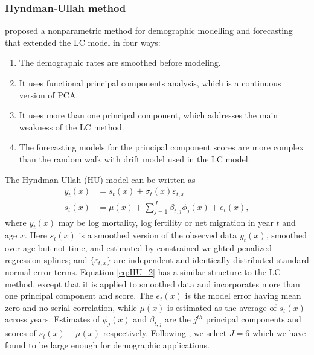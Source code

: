 \documentclass[11pt,a4paper,]{article}
\providecommand{\tightlist}{%
  \setlength{\itemsep}{0pt}\setlength{\parskip}{0pt}}
\begin{document}
\hypertarget{hyndman-ullah-method}{%
\subsubsection*{\texorpdfstring{Hyndman-Ullah method \label{sec:HU}}{Hyndman-Ullah method }}\label{hyndman-ullah-method}}

\textcite{HU07} proposed a nonparametric method for demographic modelling and forecasting that extended the LC model in four ways:

\begin{enumerate}
\def\labelenumi{\arabic{enumi}.}
\tightlist
\item
  The demographic rates are smoothed before modeling.
\item
  It uses functional principal components analysis, which is a continuous version of PCA.
\item
  It uses more than one principal component, which addresses the main weakness of the LC method.
\item
  The forecasting models for the principal component scores are more complex than the random walk with drift model used in the LC model.
\end{enumerate}

The Hyndman-Ullah (HU) model can be written as
\begin{align}
  y_t(x) & = s_t(x) + \sigma_t(x)\varepsilon_{t,x}\label{eq:HU_1}\\
  s_t(x) & = \mu(x) + \sum_{j=1}^{J}\beta_{t,j}\phi_j(x) + e_t(x)\label{eq:HU_2},
\end{align}
where \(y_t(x)\) may be log mortality, log fertility or net migration \autocite{HB08} in year \(t\) and age \(x\). Here \(s_t(x)\) is a smoothed version of the observed data \(y_t(x)\), smoothed over age but not time, and estimated by constrained weighted penalized regression splines; and \(\{\varepsilon_{t,x}\}\) are independent and identically distributed standard normal error terms. Equation \eqref{eq:HU_2} has a similar structure to the LC method, except that it is applied to smoothed data and incorporates more than one principal component and score. The \(e_t(x)\) is the model error having mean zero and no serial correlation, while \(\mu(x)\) is estimated as the average of \(s_t(x)\) across years. Estimates of \(\phi_j(x)\) and \(\beta_{t,j}\) are the \(j^{th}\) principal components and scores of \(s_t(x)-\mu(x)\) respectively. Following \textcite{HB08}, we select \(J=6\) which we have found to be large enough for demographic applications.
\end{document}
